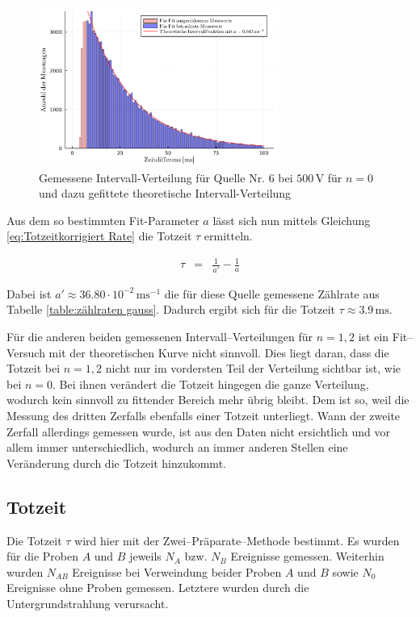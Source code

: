 \documentclass[12pt,a4paper]{scrartcl}
\numberwithin{equation}{section} %
\renewcommand{\[}{} %
\renewcommand{\]}{\noindent} %
\begin{document}
\begin{figure}
	\centering
	\includegraphics[width=0.7\textwidth]{../media/B3.1/intervalFit.pdf}
	\caption{Gemessene Intervall-Verteilung für Quelle Nr. 6 bei $500 \mathrm{\, V}$ für $n = 0$ und dazu gefittete theoretische Intervall-Verteilung}
	\label{fig:intervalFit}
\end{figure}

Aus dem so bestimmten Fit-Parameter $a$ lässt sich nun mittels Gleichung \eqref{eq:Totzeitkorrigiert Rate} die Totzeit $\tau$ ermitteln.

\begin{eqnarray}
	\tau &=& \frac{1}{a'} - \frac{1}{a}
\end{eqnarray}

\noindent
Dabei ist $a' \approx 36.80 \cdot 10^{-2} \mathrm{\,ms^{-1}}$ die für diese Quelle gemessene Zählrate aus Tabelle \ref{table:zählraten gauss}. Dadurch ergibt sich für die Totzeit $\tau \approx 3.9 \mathrm{\, ms}$.

Für die anderen beiden gemessenen Intervall--Verteilungen für $n = 1,2$ ist ein Fit--Versuch mit der theoretischen Kurve nicht sinnvoll. Dies liegt daran, dass die Totzeit bei $n = 1,2$ nicht nur im vordersten Teil der Verteilung sichtbar ist, wie bei $n = 0$. Bei ihnen verändert die Totzeit hingegen die ganze Verteilung, wodurch kein sinnvoll zu fittender Bereich mehr übrig bleibt. Dem ist so, weil die Messung des dritten Zerfalls ebenfalls einer Totzeit unterliegt. Wann der zweite Zerfall allerdings gemessen wurde, ist aus den Daten nicht ersichtlich und vor allem immer unterschiedlich, wodurch an immer anderen Stellen eine Veränderung durch die Totzeit hinzukommt.

\hypertarget{Totzeit bestimmen}{\subsection{Totzeit}\label{Totzeit bestimmen}}
Die Totzeit $\tau$ wird hier mit der Zwei--Präparate--Methode bestimmt. Es wurden für die Proben $A$ und $B$ jeweils $N_A$ bzw. $N_B$ Ereignisse gemessen. Weiterhin wurden $N_{AB}$ Ereignisse bei Verweindung beider Proben $A$ und $B$ sowie $N_0$ Ereignisse ohne Proben gemessen. Letztere wurden durch die Untergrundstrahlung verursacht.
\end{document}
